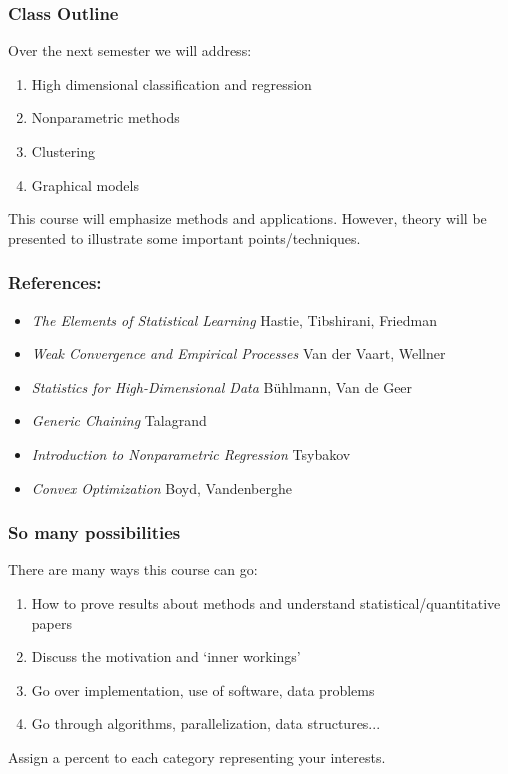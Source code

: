 \documentclass{beamer}
\begin{document}
\begin{frame}
\frametitle{Class Outline}
Over the next semester we will address:

\begin{enumerate}
\item High dimensional classification and regression
\item Nonparametric methods
\item Clustering
\item Graphical models
\end{enumerate}

\vsp

This course will emphasize methods and applications.  However, theory will be presented to illustrate 
some important points/techniques.

\end{frame}

\begin{frame}
\frametitle{References:}
\begin{itemize}
\item {\it The Elements of Statistical Learning} {\scriptsize Hastie, Tibshirani, Friedman}
\item {\it Weak Convergence and Empirical Processes} {\scriptsize Van der Vaart, Wellner}
\end{itemize}

\vsp
{}
\begin{itemize}
\item {\it Statistics for High-Dimensional Data} {\scriptsize B\"uhlmann, Van de Geer}
\item {\it Generic Chaining} {\scriptsize Talagrand}
\item {\it Introduction to Nonparametric Regression} {\scriptsize Tsybakov}
\item {\it Convex Optimization} {\scriptsize Boyd, Vandenberghe}
\end{itemize}

\end{frame}


\begin{frame}
\frametitle{So many possibilities}
There are many ways this course can go:

\vsp
\begin{enumerate}
\item {} How to prove results about methods and understand statistical/quantitative papers
\item {} Discuss the motivation and `inner workings'
\item {} Go over implementation, use of software, data problems
\item {} Go through algorithms, parallelization, data structures...
\end{enumerate}
\vsp

\pause
{} Assign a percent to each category representing your interests.
\end{frame}
\end{document}
